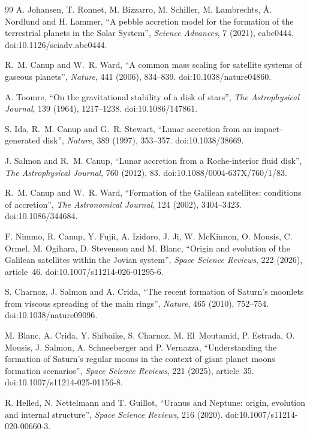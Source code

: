\documentclass[11pt,a4paper,openany]{report}
\begin{document}
\begin{thebibliography}{99}
 A. Johansen, T. Ronnet, M. Bizzarro, M. Schiller, M. Lambrechts,
Å. Nordlund and H. Lammer, ``A pebble accretion model for the formation of the terrestrial planets
in the Solar System'', \emph{Science Advances}, 7 (2021), eabc0444. doi:10.1126/sciadv.abc0444.

 R.~M. Canup and W.~R. Ward, ``A common mass scaling for satellite systems
of gaseous planets'', \emph{Nature}, 441 (2006), 834--839. doi:10.1038/nature04860.

 A. Toomre, ``On the gravitational stability of a disk of stars'',
\emph{The Astrophysical Journal}, 139 (1964), 1217--1238. doi:10.1086/147861.

 S. Ida, R.~M. Canup and G.~R. Stewart, ``Lunar accretion from an impact-generated
disk'', \emph{Nature}, 389 (1997), 353--357. doi:10.1038/38669.

 J. Salmon and R.~M. Canup, ``Lunar accretion from a Roche-interior fluid
disk'', \emph{The Astrophysical Journal}, 760 (2012), 83. doi:10.1088/0004-637X/760/1/83.

 R.~M. Canup and W.~R. Ward, ``Formation of the Galilean satellites:
conditions of accretion'', \emph{The Astronomical Journal}, 124 (2002), 3404--3423.
doi:10.1086/344684.

 F. Nimmo, R. Canup, Y. Fujii, A. Izidoro, J. Ji, W. McKinnon, O. Mousis,
C. Ormel, M. Ogihara, D. Stevenson and M. Blanc, ``Origin and evolution of the Galilean satellites
within the Jovian system'', \emph{Space Science Reviews}, 222 (2026), article~46.
doi:10.1007/s11214-026-01295-6.

 S. Charnoz, J. Salmon and A. Crida, ``The recent formation of Saturn's
moonlets from viscous spreading of the main rings'', \emph{Nature}, 465 (2010), 752--754.
doi:10.1038/nature09096.

 M. Blanc, A. Crida, Y. Shibaike, S. Charnoz, M. El~Moutamid, P. Estrada,
O. Mousis, J. Salmon, A. Schneeberger and P. Vernazza, ``Understanding the formation of Saturn's
regular moons in the context of giant planet moons formation scenarios'', \emph{Space Science
Reviews}, 221 (2025), article~35. doi:10.1007/s11214-025-01156-8.

 R. Helled, N. Nettelmann and T. Guillot, ``Uranus and Neptune: origin,
evolution and internal structure'', \emph{Space Science Reviews}, 216 (2020).
doi:10.1007/s11214-020-00660-3.


\end{thebibliography}
\end{document}
